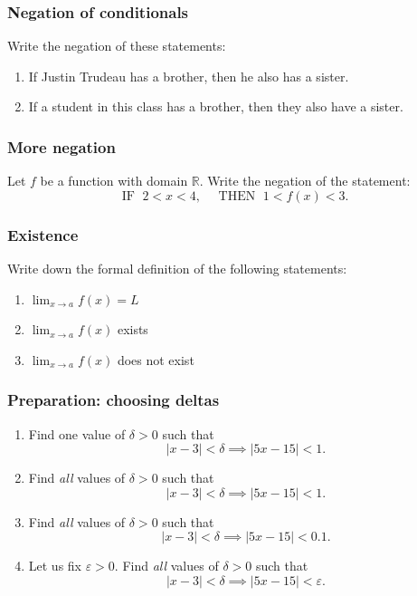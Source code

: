 \begin{frame}
	\frametitle{Negation of conditionals}

	Write the negation of these statements:
	\begin{enumerate}
		\item If Justin Trudeau has a brother, then he also has a sister.

		\item If a student in this class has a brother, then they also have a sister.
	\end{enumerate}
\end{frame}

\begin{frame}
	\frametitle{More negation}

	Let $f$ be a function with domain $\mathbb{R}$. Write the negation of the statement:
	\begin{equation*}
		\text{IF }\; 2<x<4, \quad \text{ THEN }\; 1<f(x)<3.
	\end{equation*}
\end{frame}

\begin{frame}
	\frametitle{Existence}

	Write down the formal definition of the following statements:

	\vfill
	\begin{enumerate}
		\item $\displaystyle \lim_{x \to a}f(x) = L$
			\vfill

		\item $\displaystyle \lim_{x \to a}f(x)$ exists

			\vfill

		\item $\displaystyle \lim_{x \to a}f(x)$ does not exist
	\end{enumerate}

	\vfill
\end{frame}

\begin{frame}[t]
	\frametitle{Preparation: choosing deltas}

	\begin{enumerate}
		\item Find one value of $\delta >0$ such that
			\[
				|x-3|< \delta \implies |5x-15|<1.
			\]

		\item Find \emph{all} values of $\delta >0$ such that
			\[
				|x-3|< \delta \implies |5x-15|<1.
			\]

		\item Find \emph{all} values of $\delta >0$ such that
			\[
				|x-3|< \delta \implies |5x-15|<0.1.
			\]

		\item Let us fix $\varepsilon >0$. Find \emph{all} values of $\delta >0$ such
			that
			\[
				|x-3|< \delta \implies |5x-15|<\varepsilon.
			\]
	\end{enumerate}
\end{frame}

